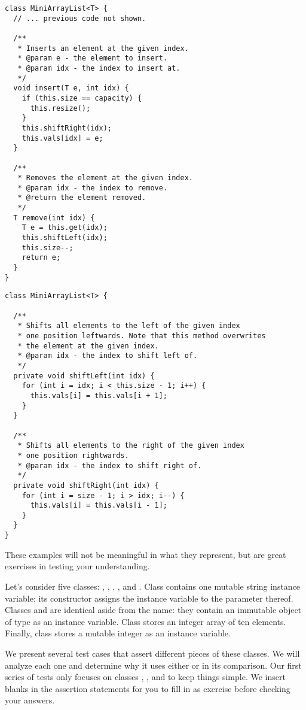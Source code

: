 \begin{lstlisting}[language=MyJava]
class MiniArrayList<T> {
  // ... previous code not shown.

  /**
   * Inserts an element at the given index.
   * @param e - the element to insert.
   * @param idx - the index to insert at.
   */
  void insert(T e, int idx) {
    if (this.size == capacity) { 
      this.resize(); 
    }
    this.shiftRight(idx);
    this.vals[idx] = e;
  }

  /**
   * Removes the element at the given index.
   * @param idx - the index to remove.
   * @return the element removed.
   */
  T remove(int idx) {
    T e = this.get(idx);
    this.shiftLeft(idx);
    this.size--;
    return e;
  }
}
\end{lstlisting}

\begin{lstlisting}[language=MyJava]
class MiniArrayList<T> {

  /**
   * Shifts all elements to the left of the given index 
   * one position leftwards. Note that this method overwrites 
   * the element at the given index.
   * @param idx - the index to shift left of.
   */
  private void shiftLeft(int idx) {
    for (int i = idx; i < this.size - 1; i++) { 
      this.vals[i] = this.vals[i + 1]; 
    }
  }

  /**
   * Shifts all elements to the right of the given index 
   * one position rightwards.
   * @param idx - the index to shift right of.
   */
  private void shiftRight(int idx) {
    for (int i = size - 1; i > idx; i--) { 
      this.vals[i] = this.vals[i - 1]; 
    }
  }
}
\end{lstlisting}

These examples will not be meaningful in what they represent, but are great exercises in testing your understanding. 

Let's consider five classes: , , , , and . 
Class  contains one mutable string instance variable; its constructor assigns the instance variable to the parameter thereof. 
Classes  and  are identical aside from the name: they contain an immutable object of type  as an instance variable. 
Class  stores an integer array of ten elements. 
Finally, class  stores a mutable integer as an instance variable.

We present several test cases that assert different pieces of these classes. 
We will analyze each one and determine why it uses either  or  in its comparison. 
Our first series of tests only focuses on classes , , and  to keep things simple. 
We insert blanks in the assertion statements for you to fill in as exercise before checking your answers.

